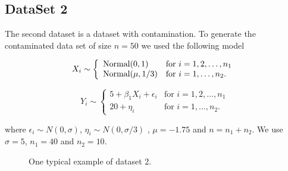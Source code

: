\documentclass[12]{report}
\begin{document}


\subsection{DataSet 2}


The second dataset is a dataset with contamination. To generate the contaminated data set of size $n = 50$ we used the following model

\[ X_i \sim \left\{ \begin{array}{ll}
         \hbox{Normal} (0, 1) & \mbox{for $i = 1,2, \dots, n_1$}\\
        \hbox{Normal} (\mu, 1/3) & \mbox{for $i = 1,  \dots, n_2$}.\end{array} \right. \]

\[ Y_i \sim \left\{ \begin{array}{ll}
         5 + \beta_1 X_i + \epsilon_i  & \mbox{for $i = 1,2, \dots, n_1$}\\
         20 + \eta_i & \mbox{for $i = 1, \dots, n_2$}.\end{array} \right. \]
         
where  $\epsilon_i \sim N(0, \sigma)$, $\eta_i \sim N(0, \sigma/3)$ , $\mu = -1.75$ and $n = n_1 + n_2$.  We use $\sigma = 5$, $n_1 = 40$ and $n_2 = 10$. \\      

\begin{figure}[hbtp]
   \centering
       \caption{One typical example of dataset 2.}
       \label{data2}
\end{figure}
        
\end{document}
